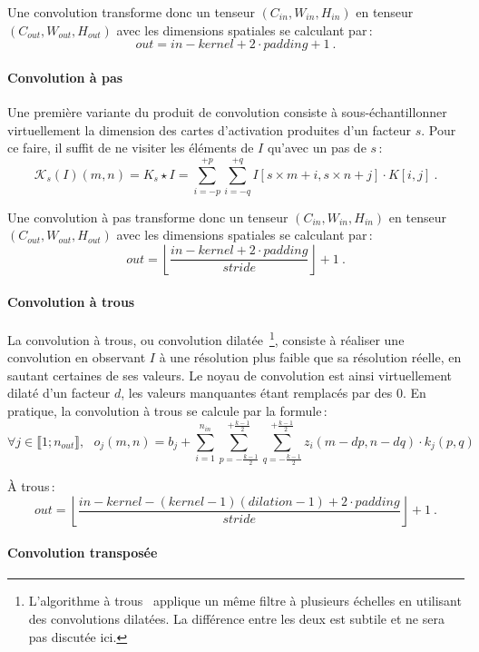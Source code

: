 Une convolution transforme donc un tenseur $(C_{in}, W_{in}, H_{in})$ en tenseur $(C_{out}, W_{out}, H_{out})$ avec les dimensions spatiales se calculant par\,:
$$out = in - kernel + 2\cdot{}padding+ 1~.$$

\paragraph{Convolution à pas}

Une première variante du produit de convolution consiste à sous-échantillonner virtuellement la dimension des cartes d'activation produites d'un facteur $s$. Pour ce faire, il suffit de ne visiter les éléments de $I$ qu'avec un pas de $s$\,:
$$\mathcal{K}_s(I)(m,n) = K_s \star I = \sum_{i=-p}^{+p} \sum_{i=-q}^{+q} I[s\times{}m + i, s\times{}n + j] \cdot K[i, j]~.$$

Une convolution à pas transforme donc un tenseur $(C_{in}, W_{in}, H_{in})$ en tenseur $(C_{out}, W_{out}, H_{out})$ avec les dimensions spatiales se calculant par\,:
$$out = \left\lfloor \frac{in - kernel + 2\cdot{}padding}{stride}\right\rfloor + 1~.$$

\paragraph{Convolution à trous}

La convolution à trous, ou convolution dilatée~\cite{yu_multi-scale_2015}\footnote{L'algorithme à trous~\cite{shensa_discrete_1992} applique un même filtre à plusieurs échelles en utilisant des convolutions dilatées. La différence entre les deux est subtile et ne sera pas discutée ici.}, consiste à réaliser une convolution en observant $I$ à une résolution plus faible que sa résolution réelle, en sautant certaines de ses valeurs. Le noyau de convolution est ainsi virtuellement dilaté d'un facteur $d$, les valeurs manquantes étant remplacés par des 0. En pratique, la convolution à trous se calcule par la formule\,:
$$\forall j \in \llbracket 1;n_{out} \rrbracket,~~~o_j(m, n) = b_j + \sum_{i=1}^{n_{in}} \sum_{p=-\frac{k-1}{2}}^{+\frac{k-1}{2}} \sum_{q=-\frac{k-1}{2}}^{+\frac{k-1}{2}} z_i(m - dp, n - dq) \cdot k_j(p, q)$$

À trous\,:
$$out = \left\lfloor \frac{in - kernel - (kernel -1)(dilation - 1) + 2\cdot{}padding}{stride}\right\rfloor + 1~.$$


\paragraph{Convolution transposée}


